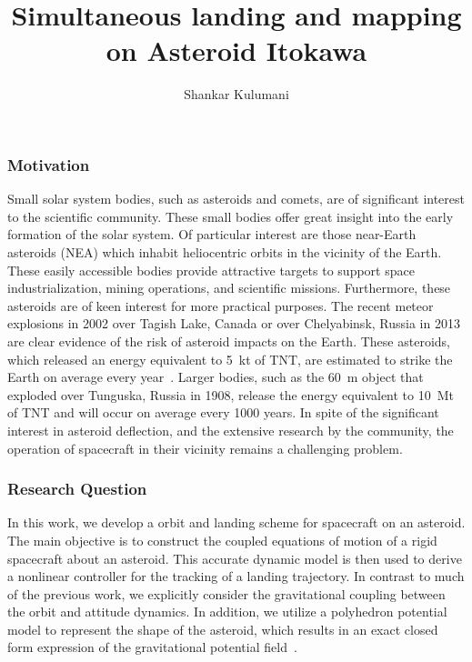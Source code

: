 \documentclass[11pt,reqno,twocolumn]{article} %
\title{Simultaneous landing and mapping on Asteroid Itokawa}
\author{Shankar Kulumani}
\date{} %
\begin{document}
\maketitle
\subsubsection*{Motivation}
Small solar system bodies, such as asteroids and comets, are of significant interest to the scientific community.
These small bodies offer great insight into the early formation of the solar system.
Of particular interest are those near-Earth asteroids (NEA) which inhabit heliocentric orbits in the vicinity of the Earth.
These easily accessible bodies provide attractive targets to support space industrialization, mining operations, and scientific missions.
Furthermore, these asteroids are of keen interest for more practical purposes.
The recent meteor explosions in  2002 over Tagish Lake, Canada or over Chelyabinsk, Russia in 2013 are clear evidence of the risk of asteroid impacts on the Earth.
These asteroids, which released an energy equivalent to \SI{5}{\kilo\tonne} of TNT, are estimated to strike the Earth on average every year~\cite{brown2002}.
Larger bodies, such as the \SI{60}{\meter} object that exploded over Tunguska, Russia in 1908, release the energy equivalent to \SI{10}{\mega\tonne} of TNT and will occur on average every \num{1000} years.
In spite of the significant interest in asteroid deflection, and the extensive research by the community, the operation of spacecraft in their vicinity remains a challenging problem.

\subsubsection*{Research Question}
In this work, we develop a orbit and landing scheme for spacecraft on an asteroid.
The main objective is to construct the coupled equations of motion of a rigid spacecraft about an asteroid.
This accurate dynamic model is then used to derive a nonlinear controller for the tracking of a landing trajectory.
In contrast to much of the previous work, we explicitly consider the gravitational coupling between the orbit and attitude dynamics.
In addition, we utilize a polyhedron potential model to represent the shape of the asteroid, which results in an exact closed form expression of the gravitational potential field~\cite{werner1994,werner1996}.
\end{document}
